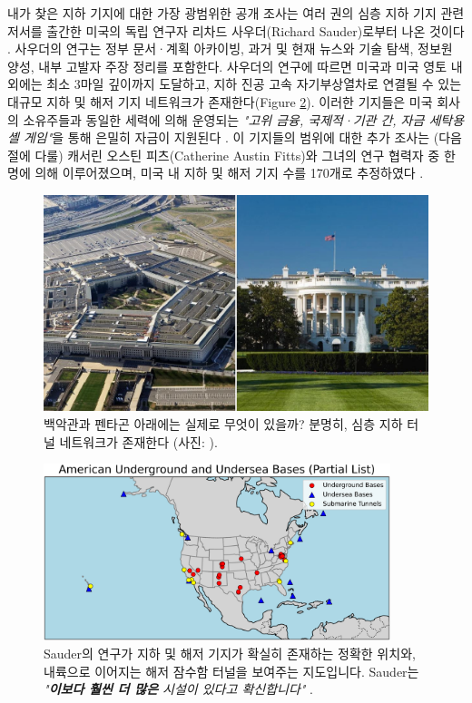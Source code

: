 \documentclass[10pt,twocolumn,letterpaper]{article}
\begin{document}
내가 찾은 지하 기지에 대한 가장 광범위한 공개 조사는 여러 권의 심층 지하 기지 관련 저서를 출간한 미국의 독립 연구자 리차드 사우더(Richard Sauder)로부터 나온 것이다 \cite{22}. 사우더의 연구는 정부 문서·계획 아카이빙, 과거 및 현재 뉴스와 기술 탐색, 정보원 양성, 내부 고발자 주장 정리를 포함한다. 사우더의 연구에 따르면 미국과 미국 영토 내외에는 최소 3마일 깊이까지 도달하고, 지하 진공 고속 자기부상열차로 연결될 수 있는 대규모 지하 및 해저 기지 네트워크가 존재한다(Figure \ref{fig:4}). 이러한 기지들은 미국 회사의 소유주들과 동일한 세력에 의해 운영되는 \textit{"고위 금융, 국제적·기관 간, 자금 세탁용 셸 게임"}을 통해 은밀히 자금이 지원된다 \cite{22}. 이 기지들의 범위에 대한 추가 조사는 (다음 절에 다룰) 캐서린 오스틴 피츠(Catherine Austin Fitts)와 그녀의 연구 협력자 중 한 명에 의해 이루어졌으며, 미국 내 지하 및 해저 기지 수를 170개로 추정하였다 \cite{16,20}.

\begin{figure}[b]
\begin{center}
   \includegraphics[width=1\linewidth]{penta.jpg}
\end{center}
   \caption{백악관과 펜타곤 아래에는 실제로 무엇이 있을까? 분명히, 심층 지하 터널 네트워크가 존재한다 (사진: \cite{31}).}
\label{fig:3}
\label{fig:onecol}
\end{figure}

\begin{figure}[t]
\begin{center}
\includegraphics[width=0.9\textwidth]{basescrop.png}
\end{center}
   \caption{Sauder의 연구가 지하 및 해저 기지가 확실히 존재하는 정확한 위치와, 내륙으로 이어지는 해저 잠수함 터널을 보여주는 지도입니다. Sauder는 \textit{"\textbf{이보다 훨씬 더 많은} 시설이 있다고 확신합니다"} \cite{22}.}
   \label{fig:4}
\end{figure}
\end{document}

